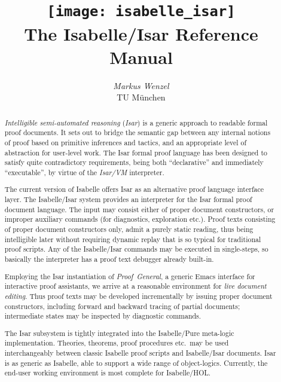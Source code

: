 \documentclass[12pt,a4paper,fleqn]{report}
\title{\texttt{[image: isabelle\_isar]} \\[4ex] The Isabelle/Isar Reference Manual}
\author{\emph{Markus Wenzel} \\ TU M\"unchen}
\begin{document}
\underscoreoff

\maketitle 

\begin{abstract}
  \emph{Intelligible semi-automated reasoning} (\emph{Isar}) is a generic
  approach to readable formal proof documents.  It sets out to bridge the
  semantic gap between any internal notions of proof based on primitive
  inferences and tactics, and an appropriate level of abstraction for
  user-level work.  The Isar formal proof language has been designed to
  satisfy quite contradictory requirements, being both ``declarative'' and
  immediately ``executable'', by virtue of the \emph{Isar/VM} interpreter.
  
  The current version of Isabelle offers Isar as an alternative proof language
  interface layer.  The Isabelle/Isar system provides an interpreter for the
  Isar formal proof document language.  The input may consist either of proper
  document constructors, or improper auxiliary commands (for diagnostics,
  exploration etc.).  Proof texts consisting of proper document constructors
  only, admit a purely static reading, thus being intelligible later without
  requiring dynamic replay that is so typical for traditional proof scripts.
  Any of the Isabelle/Isar commands may be executed in single-steps, so
  basically the interpreter has a proof text debugger already built-in.
  
  Employing the Isar instantiation of \emph{Proof~General}, a generic Emacs
  interface for interactive proof assistants, we arrive at a reasonable
  environment for \emph{live document editing}.  Thus proof texts may be
  developed incrementally by issuing proper document constructors, including
  forward and backward tracing of partial documents; intermediate states may
  be inspected by diagnostic commands.
  
  The Isar subsystem is tightly integrated into the Isabelle/Pure meta-logic
  implementation.  Theories, theorems, proof procedures etc.\ may be used
  interchangeably between classic Isabelle proof scripts and Isabelle/Isar
  documents.  Isar is as generic as Isabelle, able to support a wide range of
  object-logics.  Currently, the end-user working environment is most complete
  for Isabelle/HOL.
\end{abstract}

 \tableofcontents \clearfirst
\end{document}
